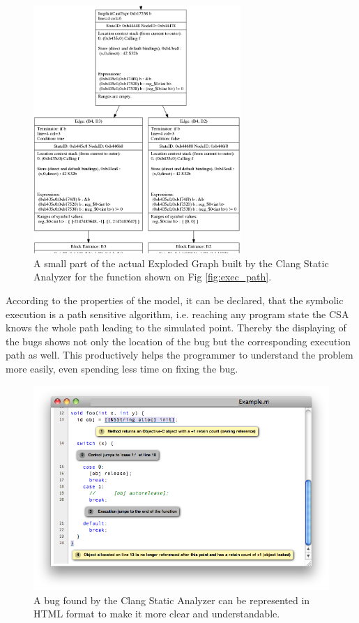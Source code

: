 \documentclass[oneside, a4paper, 12pt]{article}
\theoremstyle{definition}
\begin{document}
\begin{figure}[h]
	\centering
	\includegraphics[width=0.7\textwidth]{img/eg}
	\caption{A small part of the actual Exploded Graph built by the Clang 
	Static Analyzer for the function shown on Fig \ref{fig:exec_path}.}
	\label{fig:exploded_graph2}
\end{figure}


According to the properties of the model, it can be declared, that the symbolic execution is a path sensitive algorithm, i.e. reaching any program state the CSA knows the whole path leading to the simulated point. Thereby the displaying of the bugs shows not only the location of the bug but the corresponding execution path as well. This productively helps the programmer to understand the problem more easily, even spending less time on fixing the bug.

\begin{figure}[h]
	\centering
	\includegraphics[width=1\textwidth]{img/view}
	\caption{A bug found by the Clang Static Analyzer can be represented in HTML format to make it more clear and understandable.}
	\label{fig:hibak_megjelenitese}
\end{figure}
\end{document}
